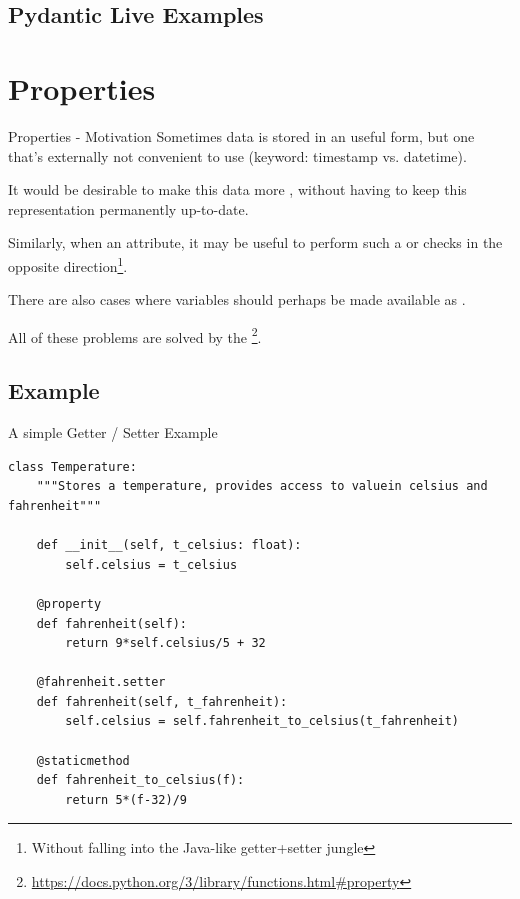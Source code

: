 \documentclass[12pt, aspectratio=169, usepdftitle=false]{beamer}
\newcommand{\pp}[1]{\lpl{#1}}
\newcommand{\furl}[1]{\footnote{\url{#1}}}
\begin{document}

\subsection{Pydantic Live Examples}

{}



\section{Properties}

\begin{frame}{Properties - Motivation}
        Sometimes data is stored in an  useful form, but one that's externally not convenient to use (keyword: timestamp vs. datetime).
		
		
		\medskip
		
		It would be desirable to make this data more ,\newline
		without having to keep this representation permanently up-to-date.
		
		\medskip
		
		Similarly, when  an attribute, it may be useful to perform such a  or checks in the opposite direction\footnote{Without falling into the Java-like getter+setter jungle}.
		
		\medskip
		
		There are also cases where variables should perhaps be made available as .
		
		\medskip
		
		All of these problems are solved by the \pp{@property} \furl{https://docs.python.org/3/library/functions.html\#property}.
\end{frame}

\subsection{Example}

\begin{frame}[fragile]{A simple Getter / Setter Example}
	
	\begin{lstlisting}[language=pytiny]
class Temperature:
    """Stores a temperature, provides access to valuein celsius and fahrenheit"""

    def __init__(self, t_celsius: float):
        self.celsius = t_celsius

    @property
    def fahrenheit(self):
        return 9*self.celsius/5 + 32

    @fahrenheit.setter
    def fahrenheit(self, t_fahrenheit):
        self.celsius = self.fahrenheit_to_celsius(t_fahrenheit)

    @staticmethod
    def fahrenheit_to_celsius(f):
        return 5*(f-32)/9
	\end{lstlisting}
	
\end{frame}
\end{document}
